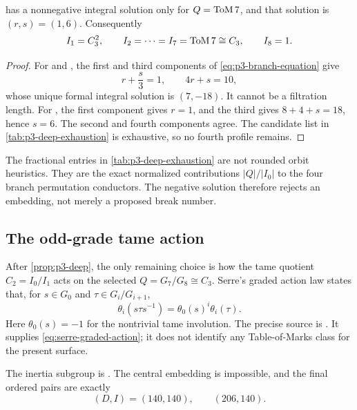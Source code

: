 \begin{proposition}
\label{prop:p3-deep}
 has a nonnegative integral solution
only for $Q=\mathrm{ToM}\,7$, and that solution is $(r,s)=(1,6)$.  Consequently
\[
 I_1=C_3^2,\qquad I_2=\cdots=I_7=\mathrm{ToM}\,7\cong C_3,\qquad I_8=1.
\]
\end{proposition}

\begin{proof}
For  and , the first and third components of
\cref{eq:p3-branch-equation} give
\[
 r+\frac{s}{3}=1,\qquad 4r+s=10,
\]
whose unique formal integral solution is $(7,-18)$.  It cannot be a
filtration length.  For , the first component gives $r=1$, and the
third gives $8+4+s=18$, hence $s=6$.  The second and fourth components agree.
The candidate list in \cref{tab:p3-deep-exhaustion} is exhaustive, so no
fourth profile remains.
\end{proof}

The fractional entries in \cref{tab:p3-deep-exhaustion} are not rounded
orbit heuristics.  They are the exact normalized contributions
$|Q|/|I_0|$ to the four branch permutation conductors.  The negative solution
therefore rejects an embedding, not merely a proposed break number.

\subsection{The odd-grade tame action}

After \cref{prop:p3-deep}, the only remaining choice is how the tame quotient
$C_2=I_0/I_1$ acts on the selected $Q=G_7/G_8\cong C_3$.  Serre's graded
action law states that, for $s\in G_0$ and
$\tau\in G_i/G_{i+1}$,
\begin{equation}
 \theta_i(s\tau s^{-1})=\theta_0(s)^i\theta_i(\tau).
\label{eq:serre-graded-action}
\end{equation}
Here $\theta_0(s)=-1$ for the nontrivial tame involution.  The precise source
is \citet[Chapter IV, \S2, Proposition 9, pp.~69--70]
{serre1979local}.  It supplies \cref{eq:serre-graded-action}; it does not
identify any Table-of-Marks class for the present surface.

\begin{proposition}
\label{prop:p3-serre}
The inertia subgroup is .  The central embedding  is
impossible, and the final ordered pairs are exactly
\begin{equation}
 (D,I)=(140,140),\qquad(206,140).
\label{eq:p3-final-di}
\end{equation}
\end{proposition}

